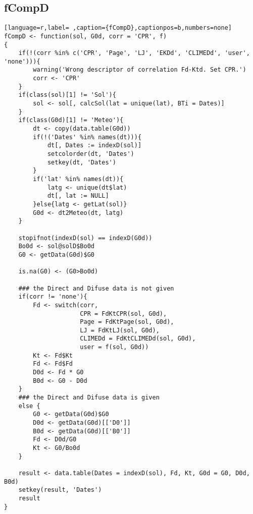 \subsection{fCompD}
\label{sec:org625fffa}
\label{subsec:fcompd}
\begin{lstlisting}[language=r,label= ,caption={fCompD},captionpos=b,numbers=none]
fCompD <- function(sol, G0d, corr = 'CPR', f)
{
    if(!(corr %in% c('CPR', 'Page', 'LJ', 'EKDd', 'CLIMEDd', 'user', 'none'))){
        warning('Wrong descriptor of correlation Fd-Ktd. Set CPR.')
        corr <- 'CPR'
    }
    if(class(sol)[1] != 'Sol'){
        sol <- sol[, calcSol(lat = unique(lat), BTi = Dates)]
    }
    if(class(G0d)[1] != 'Meteo'){
        dt <- copy(data.table(G0d))
        if(!('Dates' %in% names(dt))){
            dt[, Dates := indexD(sol)]
            setcolorder(dt, 'Dates')
            setkey(dt, 'Dates')
        }
        if('lat' %in% names(dt)){
            latg <- unique(dt$lat)
            dt[, lat := NULL]
        }else{latg <- getLat(sol)}
        G0d <- dt2Meteo(dt, latg)
    }  

    stopifnot(indexD(sol) == indexD(G0d))
    Bo0d <- sol@solD$Bo0d
    G0 <- getData(G0d)$G0

    is.na(G0) <- (G0>Bo0d)

    ### the Direct and Difuse data is not given
    if(corr != 'none'){
        Fd <- switch(corr,
                     CPR = FdKtCPR(sol, G0d),
                     Page = FdKtPage(sol, G0d),
                     LJ = FdKtLJ(sol, G0d),
                     CLIMEDd = FdKtCLIMEDd(sol, G0d),
                     user = f(sol, G0d))
        Kt <- Fd$Kt
        Fd <- Fd$Fd
        D0d <- Fd * G0
        B0d <- G0 - D0d
    }
    ### the Direct and Difuse data is given
    else {
        G0 <- getData(G0d)$G0
        D0d <- getData(G0d)[['D0']]
        B0d <- getData(G0d)[['B0']]
        Fd <- D0d/G0
        Kt <- G0/Bo0d
    }

    result <- data.table(Dates = indexD(sol), Fd, Kt, G0d = G0, D0d, B0d)
    setkey(result, 'Dates')
    result
}
\end{lstlisting}
